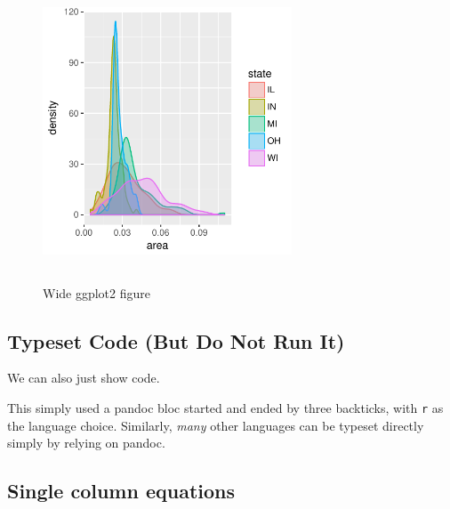 \documentclass[9pt,twocolumn,twoside,printwatermark=true]{pinp}
\begin{document}
\begin{figure}
  \begin{center}
    \includegraphics[width=0.66\textwidth, height=3.5in]{densities} 
  \end{center}
  \caption{Wide ggplot2 figure}\label{fig}
\end{figure}

\hypertarget{typeset-code-but-do-not-run-it}{%
\subsection{Typeset Code (But Do Not Run
It)}\label{typeset-code-but-do-not-run-it}}

We can also just show code.

\begin{Shaded}
\begin{Highlighting}[]
\StringTok{ }\NormalTok{faithful[,}\NormalTok{]}
\StringTok{ }
\end{Highlighting}
\end{Shaded}

This simply used a pandoc bloc started and ended by three backticks,
with \texttt{r} as the language choice. Similarly, \emph{many} other
languages can be typeset directly simply by relying on pandoc.

\hypertarget{single-column-equations}{%
\subsection{Single column equations}\label{single-column-equations}}
\end{document}
